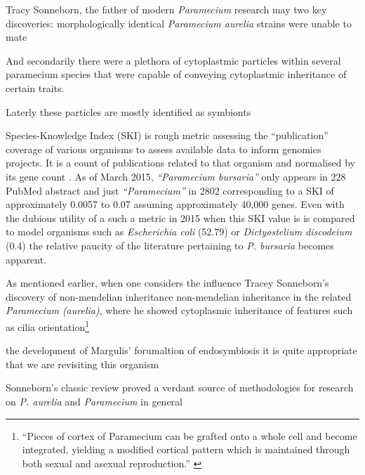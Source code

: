 Tracy Sonneborn, the father of modern \textit{Paramecium} research may two key discoveries:
morphologically identical \textit{Paramecium aurelia} strains were unable to mate 

And secondarily there were a plethora of cytoplastmic particles within several paramecium species
that were capable of conveying cytoplastmic inheritance of certain traits.

Laterly these particles are mostly identified as symbionts 


\citep{Corliss1974} 

Species-Knowledge Index (SKI) is rough metric assessing the ``publication''
coverage of various organisms to assess available data to inform genomics projects.
It is a count of publications related to that organism and normalised by its gene
count \citep{Janssen2005}. As of March 2015, \textit{``Paramecium bursaria''} only appears
in 228 PubMed abstract and just \textit{``Paramecium''} in 2802 corresponding to a
SKI of approximately 0.0057 to 0.07 assuming approximately 40,000 genes.  Even with the
dubious utility of a such a metric in 2015 when this SKI value is 
is compared to model organisms such as \textit{Escherichia coli} (52.79) or 
\textit{Dictyostelium discodeium} (0.4) the relative paucity of the literature
pertaining to \textit{P. bursaria} becomes apparent.







As mentioned earlier, when one considers the influence Tracey Sonneborn's discovery of non-mendelian
inheritance non-mendelian inheritance in the related \textit{Paramecium (aurelia)}, where he showed
cytoplasmic inheritance of features such as cilia orientation\footnote{``Pieces of cortex of Paramecium can be grafted onto a whole cell and
become integrated, yielding a modified cortical pattern which is maintained through both sexual and asexual reproduction.'' \citep{Beisson1965}}

the development of Margulis' forumaltion of endosymbiosis \citep{Margulis1998} it is
quite appropriate that we are revisiting this organism

Sonneborn's classic review \citep{Sonneborn1950} proved a verdant source of methodologies
for research on  \textit{P. aurelia} and \textit{Paramecium} in general






